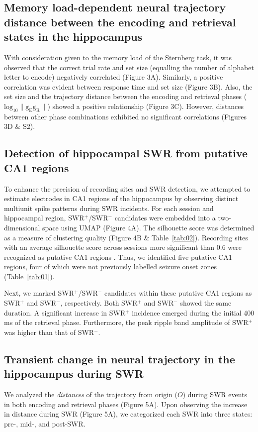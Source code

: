 \documentclass[final,3p,times,twocolumn]{elsarticle}
\begin{document}
\subsection{Memory load-dependent neural trajectory distance between the encoding and retrieval states in the hippocampus}
With consideration given to the memory load of the Sternberg task, it was observed that the correct trial rate and set size (equalling the number of alphabet letter to encode) negatively correlated (Figure 3A). Similarly, a positive correlation was evident between response time and set size (Figure 3B). Also, the set size and the trajectory distance between the encoding and retrieval phases ($\mathrm{log_{10}\lVert g_{E}g_{R} \rVert}$) showed a positive relationship (Figure 3C). However, distances between other phase combinations exhibited no significant correlations (Figures 3D \& S2).

\subsection{Detection of hippocampal SWR from putative CA1 regions}
To enhance the precision of recording sites and SWR detection, we attempted to estimate electrodes in CA1 regions of the hippocampus by observing distinct multiunit spike patterns during SWR incidents. For each session and hippocampal region, SWR$^+$/SWR$^-$ candidates were embedded into a two-dimensional space using UMAP (Figure 4A). The silhouette score was determined as a measure of clustering quality (Figure 4B \& Table~\ref{tab:02}). Recording sites with an average silhouette score across sessions more significant than 0.6 were recognized as putative CA1 regions \cite{mcinnes_umap_2018, rousseeuw_silhouettes_1987}. Thus, we identified five putative CA1 regions, four of which were not previously labelled seizure onset zones (Table~\ref{tab:01}).

Next, we marked SWR$^+$/SWR$^-$ candidates within these putative CA1 regions as SWR$^+$ and SWR$^-$, respectively. Both SWR$^+$ and SWR$^-$ showed the same duration. A significant increase in SWR$^+$ incidence emerged during the initial 400 ms of the retrieval phase. Furthermore, the peak ripple band amplitude of SWR$^+$ was higher than that of SWR$^-$.

\subsection{Transient change in neural trajectory in the hippocampus during SWR}
We analyzed the \textit{distances} of the trajectory from origin ($O$) during SWR events in both encoding and retrieval phases (Figure 5A). Upon observing the increase in distance during SWR (Figure 5A), we categorized each SWR into three states: pre-, mid-, and post-SWR. 
\end{document}
